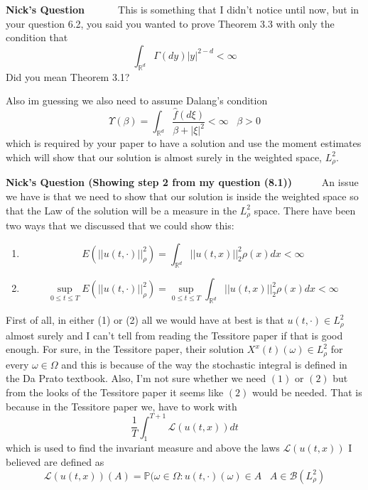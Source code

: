 \documentclass[a4paper,11pt]{article}
\theoremstyle{plain}
\theoremstyle{definition}
\newcounter{NQ}
\newenvironment{NickQuestion}[1][] %
  {\refstepcounter{NQ}
  \begin{mdframed}[backgroundcolor=lightgray]\textbf{Nick's Question \theNQ \: #1~~}~~~\noindent}%
  {\end{mdframed}}
\numberwithin{NQ}{section}
\numberwithin{LQ}{section}
\numberwithin{ZQ}{section}
\begin{document}
\begin{NickQuestion}
This is something that I didn't notice until now, but in your question 6.2, you said you wanted to prove Theorem 3.3 with only the condition that $$\int_{\mathbb R^d}\Gamma(dy)|y|^{2-d} < \infty$$ Did you mean Theorem 3.1? 

Also im guessing we also need to assume Dalang's condition $$ \Upsilon(\beta)=\int_{\mathbb R^d}\dfrac{\hat{f}(d\xi)}{\beta+|\xi|^2} < \infty \;\;\; \beta>0 $$ which is required by your paper \cite{CH16Comparison} to have a solution and use the moment estimates which will show that our solution is almost surely in the weighted space, $L^2_\rho$.
\end{NickQuestion}

\begin{NickQuestion}[(Showing step 2 from my question (8.1))]
An issue we have is that we need to show that our solution is inside the weighted space so that the Law of the solution will be a measure in the $L^2_\rho$ space. There have been two ways that we discussed that we could show this: \begin{enumerate}[(1)] 
\item $$E(||u(t,\cdot)||_\rho^2)=\int_{\mathbb R^d}||u(t,x)||_2^2\rho(x)dx < \infty$$ 
\item $$\sup_{0\le t \le T}E(||u(t,\cdot)||_\rho^2)=\sup_{0\le t \le T}\int_{\mathbb R^d}||u(t,x)||_2^2\rho(x)dx < \infty$$
\end{enumerate} First of all, in either (1) or (2) all we would have at best is that $u(t,\cdot)\in L_\rho^2$ almost surely and I can't tell from reading the Tessitore paper if that is good enough. For sure, in the Tessitore paper, their solution $X^x(t)(\omega)\in L_\rho^2$ for every $ \omega \in \Omega$ and this is because of the way the stochastic integral is defined in the Da Prato textbook. Also, I'm not sure whether we need $(1)$ or $(2)$ but from the looks of the Tessitore paper it seems like $(2)$ would be needed. That is because in the Tessitore paper we, have to work with $$ \dfrac{1}{T}\int_1^{T+1}\mathscr L(u(t,x))dt $$ which is used to find the invariant measure and above the laws $\mathscr L(u(t,x))$ I believed are defined as $$ \mathscr L(u(t,x))(A)=\mathbb P(\omega \in \Omega:u(t,\cdot)(\omega)\in A \;\;\; A \in \mathscr B (L_\rho^2) $$


\end{NickQuestion}
\end{document}
